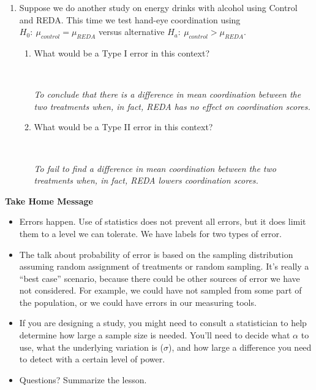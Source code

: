 \begin{enumerate}
\begin{key}
  {\it  Type II = 1--power so we want more than 90\% power.  Need 43
      people. }
\end{key}
\item Suppose we do another study on energy drinks with alcohol using
  Control and REDA.  This time we test hand-eye coordination using
  $H_0:\ \mu_{control} = \mu_{REDA}$ versus alternative  $H_a:\
  \mu_{control} > \mu_{REDA}$.
  \begin{enumerate}
  \item What would be a Type I error in this context? 
\begin{students}
 \vspace{3cm}\\
\end{students}

\begin{key}
  {\it   To conclude that there is a difference in mean coordination between the
    two treatments when, in fact, REDA has no effect on coordination scores. }
\end{key}
  \item What would be a Type II error in this context? 
\begin{students}
 \vspace{5cm}\\
\end{students}

\begin{key}
  {\it  To fail to find a difference in mean coordination between the
    two treatments when, in fact, REDA lowers coordination scores. }
\end{key}
  \end{enumerate}

\end{enumerate}


\begin{center}
  {\bf Take Home Message} \vspace{-.6cm}
\end{center}
\begin{itemize}
  \item Errors happen.  Use of statistics does not prevent all errors,
    but it does limit them to a level we can tolerate. We have labels
    for two types of error.
  \item The talk about probability of  error is based on the sampling
    distribution assuming random assignment of treatments or random
    sampling. It's really a ``best case'' scenario, because there
    could be other sources of error we have not considered.  For
    example, we could have not sampled from some part of the
    population, or we could have errors in our measuring tools.
  \item If you are designing a study, you might need to consult a
    statistician to help determine how large a sample size is
    needed. You'll need to decide what $\alpha$ to use, what the
    underlying variation is ($\sigma$), and how large a difference you
    need to detect with a certain level of power.
 \item 
  Questions? Summarize the  lesson. 
\end{itemize}\vfill




